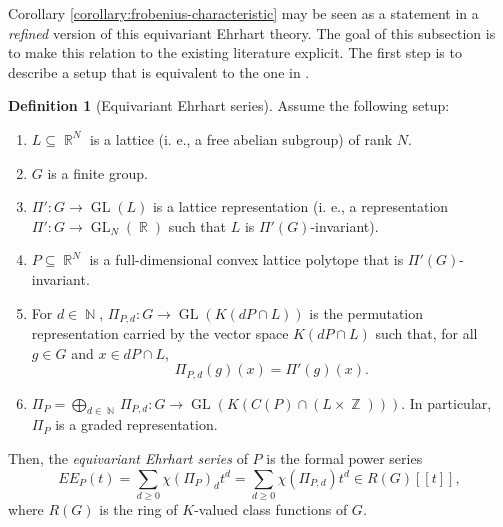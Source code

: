 \documentclass[a4paper,12pt]{amsart}
\theoremstyle{plain}
\theoremstyle{definition}
\newtheorem{definition}[theorem]{Definition}
\theoremstyle{remark}
\newtheorem{remark}[theorem]{Remark}
\DeclareMathOperator{\NN}{\mathbb{N}}
\DeclareMathOperator{\ZZ}{\mathbb{Z}}
\DeclareMathOperator{\RR}{\mathbb{R}}
\DeclareMathOperator{\GL}{GL}
\begin{document}
Corollary \ref{corollary:frobenius-characteristic} may be seen as a statement in a \emph{refined} version of this equivariant Ehrhart theory. The goal of this subsection is to make this relation to the existing literature explicit. The first step is to describe a setup that is equivalent to the one in \cite{elia-kim-supina-techniques}.
\begin{definition}[Equivariant Ehrhart series]\label{definition:equivariant-ehrhart-series}
    Assume the following setup:
    \begin{enumerate}
        \item $L \subseteq \RR^N$ is a lattice (i. e., a free abelian subgroup) of rank $N$.
        \item $G$ is a finite group.
        \item $\Pi': G \to \GL(L)$ is a lattice representation (i. e., a representation $\Pi': G \to \GL_N(\RR)$ such that $L$ is $\Pi'(G)$-invariant).
        \item $P \subseteq \RR^N$ is a full-dimensional convex lattice polytope that is $\Pi'(G)$-invariant.
        \item For $d \in \NN$, $\Pi_{P, d}: G \to \GL(K(dP \cap L))$ is the permutation representation carried by the vector space $K(dP \cap L)$ such that, for all $g \in G$ and $x \in dP \cap L$, 
        \[ \Pi_{P, d}(g)(x) = \Pi'(g)(x). \]
        \item $\Pi_P = \bigoplus_{d \in \NN} \Pi_{P, d}: G \to \GL(K(C(P) \cap (L \times \ZZ)))$. In particular, $\Pi_P$ is a graded representation.
    \end{enumerate}
    Then, the \emph{equivariant Ehrhart series} of $P$ is the formal power series
    \[
    EE_P(t) = \sum_{d \geq 0} \chi(\Pi_P)_d t^d = \sum_{d \geq 0} \chi(\Pi_{P, d}) t^d \in R(G)[\![ t ]\!],
    \]
    where $R(G)$ is the ring of $K$-valued class functions of $G$.
\end{definition}

\end{document}
